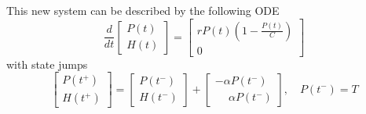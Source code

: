 \begin{enumerate}[label=\alph*)]
    This new system can be described by the following ODE
    \begin{equation}\label{eq:fish_harvest}
        \frac{d}{dt}\begin{bmatrix}P(t) \\ H(t)\end{bmatrix} = \begin{bmatrix}rP(t)\left(1 - \frac{P(t)}{C}\right) \\ 0\end{bmatrix}
    \end{equation}
    with state jumps
    \begin{equation}\label{eq:fish_jump}
        \begin{bmatrix}P(t^+) \\ H(t^+)\end{bmatrix} = \begin{bmatrix}P(t^-) \\ H(t^-)\end{bmatrix} +  \begin{bmatrix}-\alpha P(t^-) \\ \phantom{-}\alpha P(t^-)\end{bmatrix}, \quad P(t^-) = T
    \end{equation}


\end{enumerate}
